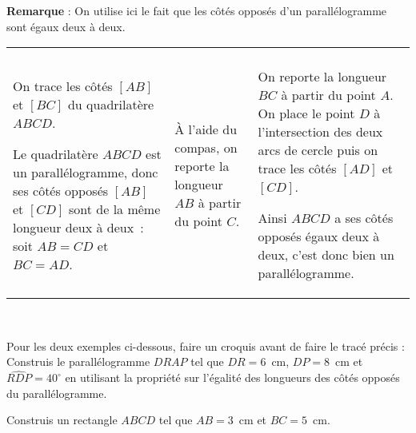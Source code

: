 \newpage





\begin{methode*1}

 
\vspace{0.8em}
\textcolor{H1}{\textbf{Remarque}} : On utilise ici le fait que les côtés opposés d'un parallélogramme sont égaux deux à deux.

 \begin{exemple*1}
 
  \begin{tabularx}{\textwidth}{X|X|X}
   \qquad  &   \qquad  &    \\ 
 On trace les côtés $[AB]$ et $[BC]$ du quadrilatère $ABCD$.
 
 Le quadrilatère $ABCD$ est un parallélogramme, donc ses côtés opposés $[AB]$ et $[CD]$ sont de la même longueur deux à deux : soit $AB = CD$ et $BC = AD$. & À l'aide du compas, on reporte la longueur $AB$ à partir du point $C$. & On reporte la longueur $BC$ à partir du point $A$. On place le point $D$ à l'intersection des deux arcs de cercle puis on trace les côtés $[AD]$ et $[CD]$.
 
Ainsi $ABCD$ a ses côtés opposés égaux deux à deux, c'est donc bien un parallélogramme.\\
\end{tabularx} \\
 
 \end{exemple*1}

\vspace*{1em}
Pour les deux exemples ci-dessous, faire un croquis avant de faire le tracé précis :\\[-2.5em]

\exercice
Construis le parallélogramme $DRAP$ tel que $DR = 6$ cm, $DP = 8$ cm et $\widehat{RDP} = 40^\circ$ en utilisant la propriété sur l'égalité des longueurs des côtés opposés du parallélogramme.

\vspace{2.7cm}

\exercice
Construis un rectangle $ABCD$ tel que $AB = 3$ cm et $BC = 5$ cm.

\end{methode*1}

